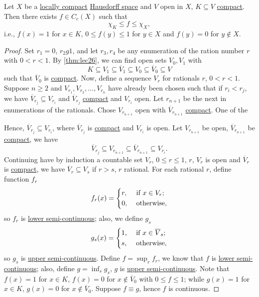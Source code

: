 \begin{theorem}\label{thm:Urysohn-lemma}
	Let \(X\) be a \hyperref[def:locally-compact]{locally compact} \hyperref[def:Hausdorff]{Hausdorff space} and \(V\) open in \(X\), \(K \subseteq V\) \hyperref[def:compact]{compact}. Then there exists \(f\in C_c(X)\) such that
	\[
		\chi _K \leq f \leq \chi _X,
	\]
	i.e., \(f(x) = 1\) for \(x\in K\), \(0 \leq f(y) \leq 1\) for \(y\in X\) and \(f(y) = 0\) for \(y \notin X\).
\end{theorem}
\begin{proof}
	Set \(r_1 = 0\), \(r_2 g 1\), and let \(r_3, r_4 \) be any enumeration of the ration number \(r\) with \(0 < r < 1\). By \autoref{thm:lec26}, we can find open sets \(V_0, V_1\) with
	\[
		K \subseteq V_1 \subseteq \overline{V} _1 \subseteq V_0 \subseteq \overline{V} _0 \subseteq V
	\]
	such that \(\overline{V} _0\) is \hyperref[def:compact]{compact}. Now, define a sequence \(V_r\) for rationals \(r\), \(0 < r < 1\). Suppose \(n \geq 2\) and \(V_{r_1}, V_{r_2}, \ldots  , V_{r_n}\) have already been chosen such that if \(r_i < r_j\), we have \(\overline{V}_{r_j} \subseteq V_{r_i}\) and \(\overline{V} _{r_j}\) \hyperref[def:compact]{compact} and \(V_{r_i}\) open. Let \(r_{n+1}\) be the next in enumerations of the rationals. Chose \(V_{r_{n+1}}\) open with \(\overline{V} _{r_{n+1}}\) \hyperref[def:compact]{compact}. One of the

	Hence, \(\overline{V} _{r_j} \subseteq V_{r_i}\), where \(\overline{V} _{r_j}\) is \hyperref[def:compact]{compact} and \(V_{r_i}\) is open. Let \(V_{r_{n+1}}\) be open, \(\overline{V} _{r_{n+1}}\) be \hyperref[def:compact]{compact}, we have
	\[
		\overline{V} _{r_j} \subseteq V_{r_{n+1}} \subseteq \overline{V} _{r_{n+1}} \subseteq V_{r_i}.
	\]
	Continuing have by induction a countable set \(V_r\), \(0 \leq r \leq 1\), \(r\), \(V_r\) is open and \(\overline{V} _r\) is \hyperref[def:compact]{compact}, we have \(\overline{V} _r \subseteq V_s\) if \(r > s\), \(r\) rational. For each rational \(r\), define function \(f_r\)
	\[
		f_r(x) = \begin{dcases}
			r, & \text{ if } x\in V_r ; \\
			0, & \text{ otherwise},
		\end{dcases}
	\]
	so \(f_r\) is \hyperref[def:lower-semi-continuous]{lower semi-continuous}; also, we define \(g_s\)
	\[
		g_s(x) = \begin{dcases}
			1, & \text{ if } x\in \overline{V} _s ; \\
			s, & \text{ otherwise},
		\end{dcases}
	\]
	so \(g_s\) is \hyperref[def:upper-semi-continuous]{upper semi-continuous}. Define \(f = \sup _{r} f_r \), we know that \(f\) is \hyperref[def:lower-semi-continuous]{lower semi-continuous}; also, define \(g = \inf _{s} g_s\), \(g\) is \hyperref[def:upper-semi-continuous]{upper semi-continuous}. Note that \(f(x) = 1\) for \(x\in K\), \(f(x) = 0\) for \(x \notin \overline{V}_0 \) with \(0 \leq f \leq 1\); while \(g(x) = 1\) for \(x\in K\), \(g(x) = 0\) for \(x \notin \overline{V} _0\). Suppose \(f\equiv g\), hence \(f\) is continuous.


\end{proof}
